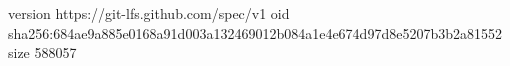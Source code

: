 version https://git-lfs.github.com/spec/v1
oid sha256:684ae9a885e0168a91d003a132469012b084a1e4e674d97d8e5207b3b2a81552
size 588057
